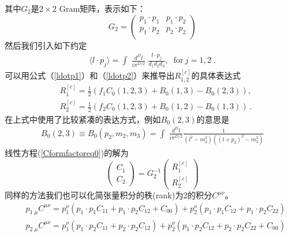 其中$G_2$是$2\times 2$ Gram矩阵，表示如下：
\begin{equation}
G_2= \left( \begin{array}{cc} p_1\cdot p_1 & p_1 \cdot p_2  \\
                              p_1\cdot p_2 &  p_2 \cdot p_2 \\
                         \end{array}\right)
\end{equation}
然后我们引入如下约定
\begin{eqnarray}
\langle l \cdot p_{j} \rangle  =
\int \;  \frac{d^D l}{i \pi^{D/2}}
\; \frac{l \cdot p_{j}}{d_1 d_2 d_3},\;\;\mbox{for}~j=1,2 \; .
\end{eqnarray}
可以用公式（\ref{ldotp1}）和（\ref{ldotp2}）来推导出$R^{[c]}_{1,2}$的具体表达式
\begin{equation}
\begin{split}
& R^{[c]}_{1} = \frac{1}{2} (f_1 C_0(1,2,3)+B_0(1,3)-B_0(2,3)), 
\\
& R^{[c]}_{2} = \frac{1}{2} (f_2 C_0(1,2,3)+B_0(1,2)-B_0(1,3)) \,. 
\label{Rdef}
\end{split}
\end{equation}
在上式中使用了比较紧凑的表达方式，例如$B_0(2,3)$的意思是
\begin{eqnarray}
B_{0}(2,3) \equiv B_{0}(p_2,m_2,m_3)=
\int \;
\frac{d^D l}{i \pi^{D/2}}
  \frac{1} {(l^2-m_2^2) ((l+p_2)^2-m_3^2)}
\label{CompactNotation1}
\end{eqnarray}
线性方程(\ref{Cformfactoreq0})的解为
\begin{equation}
\left( \begin{array}{c} C_{1}\\
C_{2} \end{array}\right) =G_2^{-1} \left( \begin{array}{c} R^{[c]}_1\\
 R^{[c]}_2 \end{array}\right)
\label{Cformfactoreq1}
\end{equation}
同样的方法我们也可以化简张量积分的秩(rank)为2的积分$C^{\mu\nu}$。
\begin{equation}
\begin{split}
& p_{1\;\mu} C^{\mu \nu} = p_1^\nu (p_1\cdot p_1 C_{11} +p_1\cdot p_2 C_{12}+C_{00}) 
+p_2^\nu (p_1\cdot p_1 C_{12} +p_1\cdot p_2 C_{22})  \\ 
& p_{2\;\mu} C^{\mu \nu} = p_1^\nu (p_1\cdot p_2 C_{11} +p_2\cdot p_2 C_{12}) 
+p_2^\nu (p_1\cdot p_2 C_{12} +p_2\cdot p_2 C_{22}+C_{00})
\label{Rank2}
\end{split}
\end{equation}
